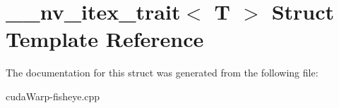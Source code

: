 \hypertarget{struct____nv__itex__trait}{}\section{\+\_\+\+\_\+nv\+\_\+itex\+\_\+trait$<$ T $>$ Struct Template Reference}
\label{struct____nv__itex__trait}


The documentation for this struct was generated from the following file\+:\begin{DoxyCompactItemize}
\item 
cuda\+Warp-\/fisheye.\+cpp\end{DoxyCompactItemize}
